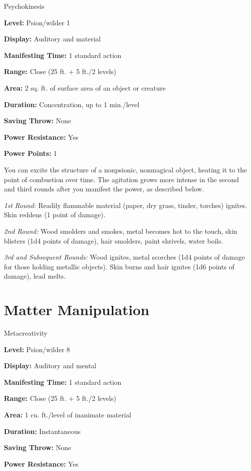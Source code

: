 \documentclass{article}
\begin{document}
Psychokinesis

\textbf{Level:} Psion/wilder 1

\textbf{Display:} Auditory and material

\textbf{Manifesting Time:} 1 standard action

\textbf{Range:} Close (25 ft. + 5 ft./2 levels)

\textbf{Area:} 2 sq. ft. of surface area of an object or creature

\textbf{Duration:} Concentration, up to 1 min./level

\textbf{Saving Throw:} None

\textbf{Power Resistance:} Yes

\textbf{Power Points:} 1

You can excite the structure of a nonpsionic, nonmagical object, heating it to 
the point of combustion over time. The agitation grows more intense in the second 
and third rounds after you manifest the power, as described below.

\textit{1st Round: }Readily flammable material (paper, dry grass, tinder, torches) 
ignites. Skin reddens (1 point of damage).

\textit{2nd Round: }Wood smolders and smokes, metal becomes hot to the touch, skin 
blisters (1d4 points of damage), hair smolders, paint shrivels, water boils.

\textit{3rd and Subsequent Rounds: }Wood ignites, metal scorches (1d4 points of 
damage for those holding metallic objects). Skin burns and hair ignites (1d6 points 
of damage), lead melts.

\vspace{12pt}
\section*{Matter Manipulation}

Metacreativity

\textbf{Level:} Psion/wilder 8

\textbf{Display:} Auditory and mental

\textbf{Manifesting Time:} 1 standard action

\textbf{Range:} Close (25 ft. + 5 ft./2 levels)

\textbf{Area:} 1 cu. ft./level of inanimate material

\textbf{Duration:} Instantaneous

\textbf{Saving Throw:} None

\textbf{Power Resistance:} Yes
\end{document}
